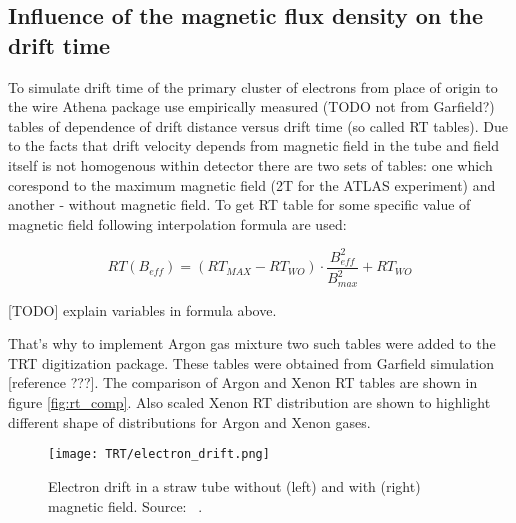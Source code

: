 \subsection{Influence of the magnetic flux density on the drift time}

To simulate drift time of the primary cluster of electrons from place of origin to the wire Athena package 
use empirically measured (TODO not from Garfield?) tables of dependence of drift distance versus drift time (so called RT tables). 
Due to the facts that drift velocity depends from magnetic field in the tube and field itself is not homogenous within detector 
there are two sets of tables: one which corespond to the maximum magnetic field (2T for the ATLAS experiment) and another - without magnetic field. To get RT table
for some specific value of magnetic field following interpolation formula are used:

\begin{displaymath}
    RT(B_{eff}) = (RT_{MAX} - RT_{WO}) \cdot \dfrac{B_{eff}^2}{B_{max}^2} + RT_{WO}
\end{displaymath}

[TODO] explain variables in formula above.

That's why to implement Argon gas mixture two such tables were added to the TRT digitization package.
These tables were obtained from Garfield simulation [reference ???].
The comparison of Argon and Xenon RT tables are shown in figure \ref{fig:rt_comp}. 
Also scaled Xenon RT distribution are shown to highlight different shape of distributions for Argon and Xenon gases.


\begin{figure}
\begin{center}
 \texttt{[image: TRT/electron\_drift.png]}
\caption {Electron drift in a straw tube without (left) and with (right) magnetic field. Source: ~\cite{cwetanski_thesis}. 
}
\end{center}
\label{fig:clusterDriftInTube}
\end{figure}


